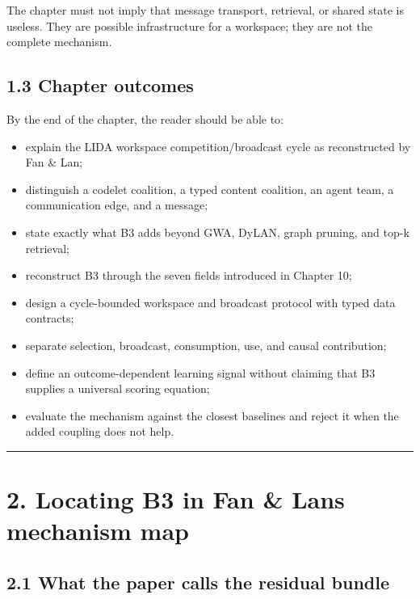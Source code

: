 The chapter must not imply that message transport, retrieval, or shared state is useless. They are possible infrastructure for a workspace; they are not the complete mechanism.

\subsection{1.3 Chapter outcomes}\label{13-chapter-outcomes}

By the end of the chapter, the reader should be able to:

\begin{itemize}
\tightlist
\item
  explain the LIDA workspace competition/broadcast cycle as reconstructed by Fan \& Lan;
\item
  distinguish a codelet coalition, a typed content coalition, an agent team, a communication edge, and a message;
\item
  state exactly what B3 adds beyond GWA, DyLAN, graph pruning, and top-k retrieval;
\item
  reconstruct B3 through the seven fields introduced in Chapter 10;
\item
  design a cycle-bounded workspace and broadcast protocol with typed data contracts;
\item
  separate selection, broadcast, consumption, use, and causal contribution;
\item
  define an outcome-dependent learning signal without claiming that B3 supplies a universal scoring equation;
\item
  evaluate the mechanism against the closest baselines and reject it when the added coupling does not help.
\end{itemize}

\begin{center}\rule{0.5\linewidth}{0.5pt}\end{center}

\section{2. Locating B3 in Fan \& Lan\textquotesingle s mechanism map}\label{2-locating-b3-in-fan--lans-mechanism-map}

\subsection{2.1 What the paper calls the residual bundle}\label{21-what-the-paper-calls-the-residual-bundle}

